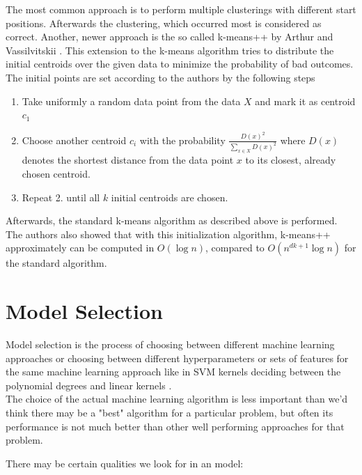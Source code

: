 The most common approach is to perform multiple clusterings with different start positions. Afterwards the clustering, which occurred most is considered as correct. Another, newer approach is the so called k-means++ by Arthur and Vassilvitskii \cite{Arthur}. This extension to the k-means algorithm tries to distribute the initial centroids over the given data to minimize the probability of bad outcomes. The initial points are set according to the authors by the following steps

\begin{enumerate}
    \item Take uniformly a random data point from the data $X$ and mark it as centroid $c_1$
    \item Choose another centroid $c_i$ with the probability $\frac{D(x)^2}{\sum_{x \in X} D(x)^2}$ where $D(x)$ denotes the shortest distance from the data point $x$ to its closest, already chosen centroid.
    \item Repeat 2. until all $k$ initial centroids are chosen.
\end{enumerate}
Afterwards, the standard k-means algorithm as described above is performed. The authors also showed that with this initialization algorithm, k-means++ approximately can be computed in $O(\log n)$, compared to $O(n^{dk+1} \log n)$ for the standard algorithm.



\section{Model Selection } \label{ms}
Model selection is the process of choosing between different machine learning approaches  or choosing between different hyperparameters or sets of features for the same machine learning approach  like in SVM kernels deciding between the polynomial degrees and  linear kernels .\\
The choice of the actual machine learning algorithm is less important than we'd think  there may be a "best" algorithm for a particular problem, but often its performance is not much better than other well performing approaches for that problem.

There may be certain qualities we look for in an model:

